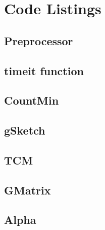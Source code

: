 \chapter{Code Listings}
\label{appendix:codes}

\section{Preprocessor}
\label{appendix:preprocessor}

\section{timeit function}
\label{appendix:timeit}

\section{CountMin}
\label{appendix:countmin}

\section{gSketch}
\label{appendix:gsketch}

\section{TCM}
\label{appendix:tcm}

\section{GMatrix}
\label{appendix:gmatrix}

\section{Alpha}
\label{appendix:alpha}
